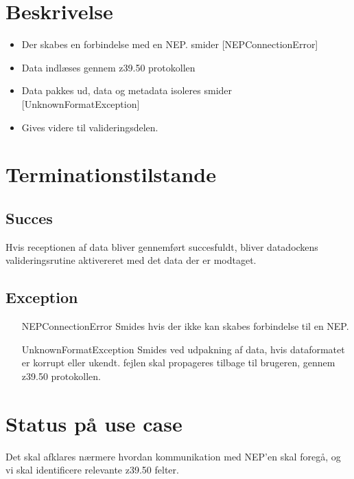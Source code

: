 \documentclass{article}
\begin{document}
\section{Beskrivelse}


\begin{itemize}
\item Der skabes en forbindelse med en NEP.
  smider [NEPConnectionError]
\item Data indlæses gennem z39.50 protokollen
\item Data pakkes ud, data og metadata isoleres
  smider [UnknownFormatException]
\item Gives videre til valideringsdelen.
\end{itemize}

\section{Terminationstilstande}

\subsection{Succes}
Hvis receptionen af data bliver gennemført succesfuldt, bliver
datadockens valideringsrutine aktivereret med det data der er modtaget.

\subsection{Exception}
\begin{itemize}
\item [NEPConnectionError]
  Smides hvis der ikke kan skabes forbindelse til en NEP.  
\item [UnknownFormatException] 
  Smides ved udpakning af data, hvis dataformatet er korrupt eller
  ukendt. fejlen skal propageres tilbage til brugeren, gennem z39.50
  protokollen.
\end{itemize}

\section{Status på use case}
Det skal afklares nærmere hvordan kommunikation med NEP'en skal
foregå, og vi skal identificere relevante z39.50 felter.
\end{document}
